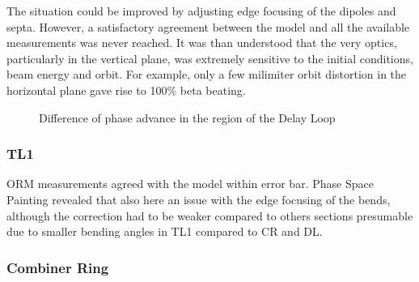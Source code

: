 The situation could be improved by adjusting edge focusing of the dipoles and septa.
However, a satisfactory agreement between the model and 
all the available measurements was never reached. 
It was than understood that the very optics, 
particularly in the vertical plane, was extremely sensitive to the initial conditions,
beam energy and orbit. For example, only a few milimiter orbit distortion 
in the horizontal plane gave rise to 100\% beta beating. 

\begin{figure}
 \begin{center}
 \caption{Difference of phase advance in the region of the Delay Loop}
  \label{fig:0302_PhSpPaint_DLini}

 \end{center}
\end{figure}


\subsubsection{TL1}

ORM measurements agreed with the model within error bar.
Phase Space Painting revealed that also here an issue with the edge focusing 
of the bends, although the correction had to be weaker compared to others sections 
presumable due to smaller bending angles in TL1 compared to CR and DL.


\subsubsection{Combiner Ring}


